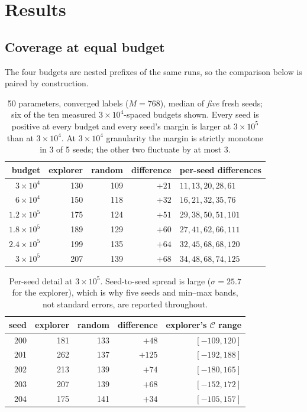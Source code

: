 \documentclass[11pt]{article}
\newcommand{\good}[1]{\textcolor{blue!70!black}{\textbf{#1}}}
\begin{document}
\section{Results}
\label{sec:coverage}

\subsection{Coverage at equal budget}

The four budgets are nested prefixes of the same runs, so the comparison below
is paired by construction.

\begin{table}[h]\centering\small
\begin{tabular}{rrrrl}
\toprule
budget & explorer & random & difference & per-seed differences \\
\midrule
$3\times10^4$  & 130 & 109 & $+21$ & $11,13,20,28,61$ \\
$6\times10^4$  & 150 & 118 & $+32$ & $16,21,32,35,76$ \\
$1.2\times10^5$& 175 & 124 & $+51$ & $29,38,50,51,101$ \\
$1.8\times10^5$& 189 & 129 & $+60$ & $27,41,62,66,111$ \\
$2.4\times10^5$& 199 & 135 & $+64$ & $32,45,68,68,120$ \\
$3\times10^5$  & 207 & 139 & \good{$+68$} & $34,48,68,74,125$ \\
\bottomrule
\end{tabular}
\caption{50 parameters, converged labels ($M=768$), median of \emph{five}
fresh seeds; six of the ten measured $3\times10^4$-spaced budgets shown. Every
seed is positive at every budget and every seed's margin is larger at
$3\times10^5$ than at $3\times10^4$. At $3\times10^4$ granularity the margin is
strictly monotone in 3 of 5 seeds; the other two fluctuate by at most $3$.}
\end{table}

\begin{table}[h]\centering\small
\begin{tabular}{rrrrr}
\toprule
seed & explorer & random & difference & explorer's $\mathcal{C}$ range \\
\midrule
200 & 181 & 133 & $+48$ & $[-109,120]$ \\
201 & 262 & 137 & $+125$ & $[-192,188]$ \\
202 & 213 & 139 & $+74$ & $[-180,165]$ \\
203 & 207 & 139 & $+68$ & $[-152,172]$ \\
204 & 175 & 141 & $+34$ & $[-105,157]$ \\
\bottomrule
\end{tabular}
\caption{Per-seed detail at $3\times10^5$. Seed-to-seed spread is large
($\sigma=25.7$ for the explorer), which is why five seeds and min--max bands,
not standard errors, are reported throughout.}
\end{table}
\end{document}
